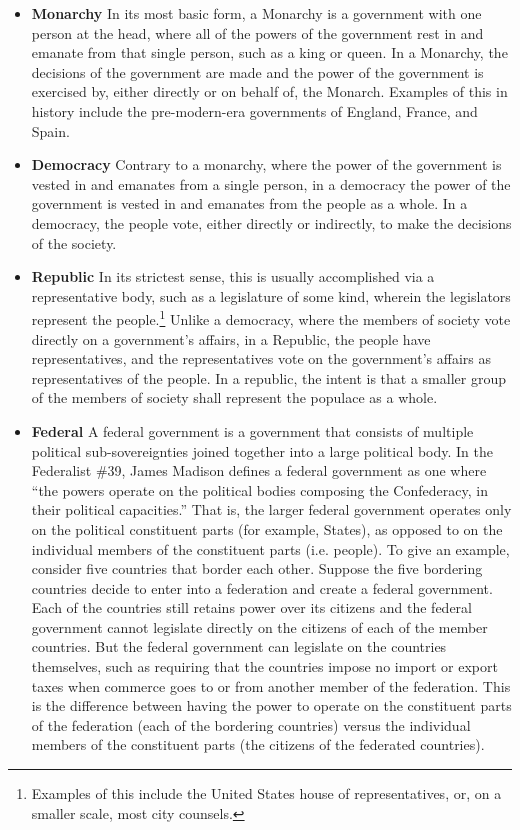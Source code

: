 \begin{itemize}
\item \textbf{Monarchy}
In its most basic form, a Monarchy is a government with one person at the head, where all of the powers of the government rest in and emanate from that single person, such as a king or queen. In a Monarchy, the decisions of the government are made and the power of the government is exercised by, either directly or on behalf of, the Monarch.  Examples of this in history include the pre-modern-era governments of England, France, and Spain.

\item \textbf{Democracy}
Contrary to a monarchy, where the power of the government is vested in and emanates from a single person, in a democracy the power of the government is vested in and emanates from the people as a whole.  In a democracy, the people vote, either directly or indirectly, to make the decisions of the society.

\item \textbf{Republic}
In its strictest sense, this is usually accomplished via a representative body, such as a legislature of some kind, wherein the legislators represent the people.\footnote{Examples of this include the United States house of representatives, or, on a smaller scale, most city counsels.}  Unlike a democracy, where the members of society vote directly on a government's affairs, in a Republic, the people have representatives, and the representatives vote on the government's affairs as representatives of the people.  In a republic, the intent is that a smaller group of the members of society shall represent the populace as a whole.  

\item \textbf{Federal}
A federal government is a government that consists of multiple political sub-sovereignties joined together into a large political body.  In the Federalist \#39, James Madison defines a federal government as one where ``the powers operate on the political bodies composing the Confederacy, in their political capacities.''  That is, the larger federal government operates only on the political constituent parts (for example, States), as opposed to on the individual members of the constituent parts (i.e. people).  To give an example, consider five countries that border each other.  Suppose the five bordering countries decide to enter into a federation and create a federal government.  Each of the countries still retains power over its citizens and the federal government cannot legislate directly on the citizens of each of the member countries.  But the federal government can legislate on the countries themselves, such as requiring that the countries impose no import or export taxes when commerce goes to or from another member of the federation.  This is the difference between having the power to operate on the constituent parts of the federation (each of the bordering countries) versus the individual members of the constituent parts (the citizens of the federated countries).


\end{itemize}
